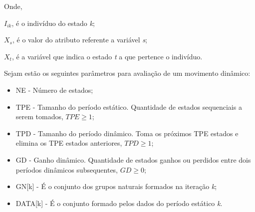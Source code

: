 \begin{table}[!ht]
	\centering
\end{table}

Onde, 

${I_{ik}}$, é o indivíduo do estado \textit{k};

${X_s}$, é o valor do atributo referente a variável \textit{s};

${X_t}$, é a variável que indica o estado \textit{t} a que pertence o indivíduo.

Sejam estão os seguintes parâmetros para avaliação de um movimento dinâmico:
\begin{itemize}
    \item NE - Número de estados;
    \item TPE - Tamanho do período estático. Quantidade de estados sequenciais a serem tomados, ${TPE \geqslant 1}$;
    \item TPD - Tamanho do período dinâmico. Toma os próximos TPE estados e elimina os TPE estados anteriores, ${TPD \geqslant 1}$;
    \item GD - Ganho dinâmico. Quantidade de estados ganhos ou perdidos entre dois períodos dinâmicos subsequentes, ${GD \geqslant 0}$;
    \item GN[k] - É o conjunto dos grupos naturais formados na iteração \textit{k};
    \item DATA[k] - É o conjunto formado pelos dados do período estático \textit{k}.
\end{itemize}

